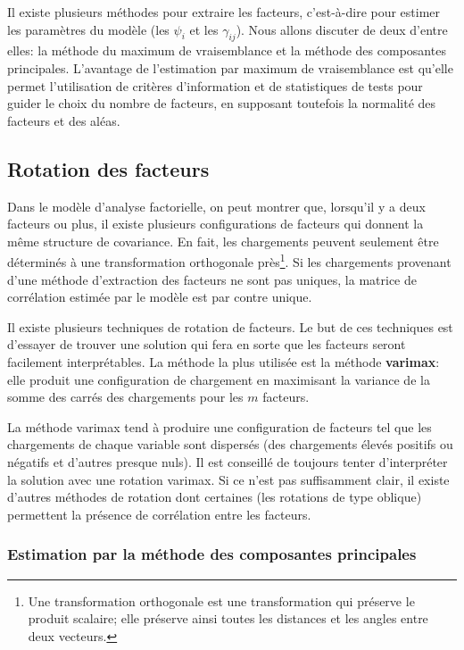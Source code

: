 \documentclass[
  11pt,
  letterpaper,
]{book}
\theoremstyle{definition}
\theoremstyle{remark}
\begin{document}
Il existe plusieurs méthodes pour extraire les facteurs, c'est-à-dire
pour estimer les paramètres du modèle (les \(\psi_i\) et les
\(\gamma_{ij}\)). Nous allons discuter de deux d'entre elles: la méthode
du maximum de vraisemblance et la méthode des composantes principales.
L'avantage de l'estimation par maximum de vraisemblance est qu'elle
permet l'utilisation de critères d'information et de statistiques de
tests pour guider le choix du nombre de facteurs, en supposant toutefois
la normalité des facteurs et des aléas.

\hypertarget{rotation-des-facteurs}{%
\subsection{Rotation des facteurs}\label{rotation-des-facteurs}}

Dans le modèle d'analyse factorielle, on peut montrer que, lorsqu'il y a
deux facteurs ou plus, il existe plusieurs configurations de facteurs
qui donnent la même structure de covariance. En fait, les chargements
peuvent seulement être déterminés à une transformation orthogonale
près\footnote{Une transformation orthogonale est une transformation qui
  préserve le produit scalaire; elle préserve ainsi toutes les distances
  et les angles entre deux vecteurs.}. Si les chargements provenant
d'une méthode d'extraction des facteurs ne sont pas uniques, la matrice
de corrélation estimée par le modèle est par contre unique.

Il existe plusieurs techniques de rotation de facteurs. Le but de ces
techniques est d'essayer de trouver une solution qui fera en sorte que
les facteurs seront facilement interprétables. La méthode la plus
utilisée est la méthode \textbf{varimax}: elle produit une configuration
de chargement en maximisant la variance de la somme des carrés des
chargements pour les \(m\) facteurs.

La méthode varimax tend à produire une configuration de facteurs tel que
les chargements de chaque variable sont dispersés (des chargements
élevés positifs ou négatifs et d'autres presque nuls). Il est conseillé
de toujours tenter d'interpréter la solution avec une rotation varimax.
Si ce n'est pas suffisamment clair, il existe d'autres méthodes de
rotation dont certaines (les rotations de type oblique) permettent la
présence de corrélation entre les facteurs.

\hypertarget{estimation-par-la-muxe9thode-des-composantes-principales}{%
\subsubsection{Estimation par la méthode des composantes
principales}\label{estimation-par-la-muxe9thode-des-composantes-principales}}
\end{document}
